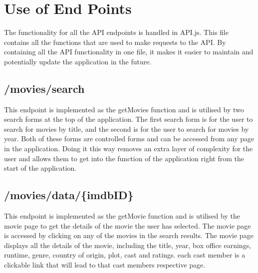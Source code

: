 \documentclass[12pt,a4paper]{article}
\begin{document}
	\newpage

	\section{Use of End Points}
		The functionality for all the API endpoints is handled in API.js. This file contains all the 
		functions that are used to make requests to the API. By containing all the API functionality 
		in one file, it makes it easier to maintain and potentially update the application in the 
		future.\\

		\subsection{/movies/search}
			This endpoint is implemented as the getMovies function and is utilised by two 
			search forms at the top of the application. The first search form is for the user to search 
			for movies by title, and the second is for the user to search for movies by year. Both of 
			these forms are controlled forms and can be accessed from any page in the application. Doing 
			it this way removes an extra layer of complexity for the user and allows them to get into the 
			function of the application right from the start of	the application.\\

			\begin{center}
			\end{center}

		\newpage

		\subsection{/movies/data/\{imdbID\}}
			This endpoint is implemented as the getMovie function and is utilised by the movie page to 
			get the details of the movie the user has selected. The movie page is accessed by clicking 
			on any of the movies in the search results. The movie page displays all the details of the 
			movie, including the title, year, box office earnings, runtime, genre, country of origin, 
			plot, cast and ratings. each cast member is a clickable link that will lead to that cast 
			members respective page.\\
\end{document}
